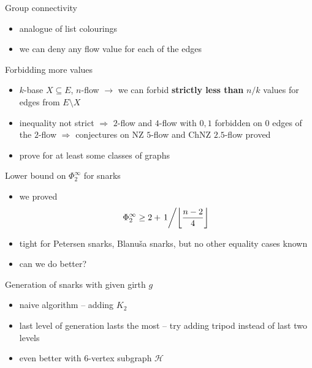 \documentclass{beamer}
\begin{document}
\begin{frame}{Group connectivity}
	\begin{itemize}
		\item analogue of list colourings
		\item we can deny any flow value for each of the edges
	\end{itemize}
	Forbidding more values
	\begin{itemize}
		\item $k$-base $X\subseteq E$, $n$-flow $\to$ we can forbid \textbf{strictly less than} $n/k$ values for edges from $E\setminus X$
		\item inequality not strict $\Rightarrow$ $2$-flow and $4$-flow with $0,1$ forbidden on $0$ edges of the $2$-flow $\Rightarrow$ conjectures on NZ $5$-flow and ChNZ $2.5$-flow proved
		\item prove for at least some classes of graphs
	\end{itemize}
\end{frame}

\begin{frame}{Lower bound on $\Phi_2^\infty$ for snarks}
	\begin{itemize}
		\item we proved
		\begin{equation*}
			\Phi_2^\infty\geq 2+\left.1\middle/\left\lfloor\frac{n-2}4\right\rfloor\right.
		\end{equation*}
		\item tight for Petersen snarks, Blanuša snarks, but no other equality cases known
		\item can we do better?
	\end{itemize}
\end{frame}

\begin{frame}{Generation of snarks with given girth $g$}
	\begin{itemize}
		\item naive algorithm -- adding $K_2$
		\begin{figure}
			\centering
			
		\end{figure}
		\item last level of generation lasts the most -- try adding tripod instead of last two levels
		\begin{figure}
			\centering
			
		\end{figure}
		\item even better with $6$-vertex subgraph $\mathcal H$
		\begin{figure}
			\centering
			
		\end{figure}
	\end{itemize}
\end{frame}
\end{document}
